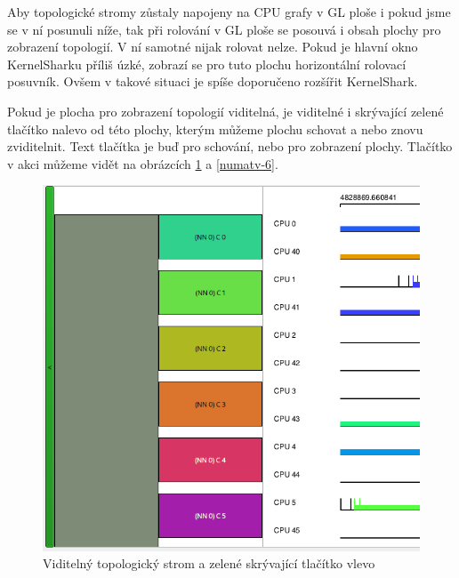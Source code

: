 Aby topologické stromy zůstaly napojeny na CPU grafy v GL ploše i pokud jsme se v ní posunuli níže, tak při rolování v GL ploše se posouvá i obsah plochy pro zobrazení topologií. V ní samotné nijak rolovat nelze. Pokud je hlavní okno KernelSharku příliš úzké, zobrazí se pro tuto plochu horizontální rolovací posuvník. Ovšem v takové situaci je spíše doporučeno rozšířit KernelShark.

Pokud je plocha pro zobrazení topologií viditelná, je viditelné i skrývající zelené tlačítko nalevo od této plochy, kterým můžeme plochu schovat a nebo znovu zviditelnit. Text tlačítka je buď \uv{<} pro schování, nebo \uv{>} pro zobrazení plochy. Tlačítko v akci můžeme vidět na obrázcích \ref{numatv-5} a \ref{numatv-6}.

\begin{figure}[p]\centering
    \includegraphics[width=140mm]{img/NUMATV/numatv-5}
    \caption{Viditelný topologický strom a zelené skrývající tlačítko vlevo}
    \label{numatv-5}
\end{figure}

